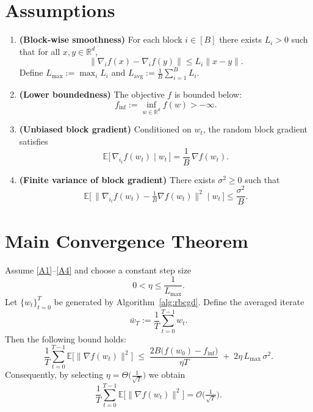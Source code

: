 \documentclass{article}
\begin{document}
\section*{Assumptions}
\begin{enumerate}[label=\textbf{A\arabic*}]
\item \label{A1} \textbf{(Block‑wise smoothness)}  
For each block $i\in[B]$ there exists $L_i>0$ such that for all $x,y\in\mathbb{R}^d$,
\[
\big\|\nabla_i f(x)-\nabla_i f(y)\big\|
   \le L_i\big\|x-y\big\|.
\]
Define $L_{\max}:=\max_i L_i$ and $L_{\mathrm{avg}}:=\frac1B\sum_{i=1}^B L_i$.

\item \label{A2} \textbf{(Lower boundedness)}  
The objective $f$ is bounded below:
\[
f_{\inf}:=\inf_{w\in\mathbb{R}^d} f(w) > -\infty .
\]

\item \label{A3} \textbf{(Unbiased block gradient)}  
Conditioned on $w_t$, the random block gradient satisfies
\[
\mathbb{E}\!\big[\,\nabla_{i_t} f(w_t)\mid w_t\,\big]=\frac1B\,\nabla f(w_t).
\]

\item \label{A4} \textbf{(Finite variance of block gradient)}  
There exists $\sigma^2\ge0$ such that
\[
\mathbb{E}\!\big[\,\|\nabla_{i_t} f(w_t)-\tfrac1B\nabla f(w_t)\|^2\mid w_t\,\big]
\le \frac{\sigma^2}{B}.
\]
\end{enumerate}

\section*{Main Convergence Theorem}
\begin{theorem}\label{thm:main}
Assume \ref{A1}–\ref{A4} and choose a constant step size
\[
0<\eta\le \frac{1}{L_{\max}} .
\]
Let $\{w_t\}_{t=0}^T$ be generated by Algorithm~\ref{alg:rbcgd}.  
Define the averaged iterate
\[
\bar w_T:=\frac1T\sum_{t=0}^{T-1} w_t .
\]
Then the following bound holds:
\[
\frac{1}{T}\sum_{t=0}^{T-1}\mathbb{E}\!\big[\|\nabla f(w_t)\|^2\big]
\;\le\;
\frac{2B\big(f(w_0)-f_{\inf}\big)}{\eta T}
\;+\;
2\eta\,L_{\max}\,\sigma^2 .
\tag{1}
\]
Consequently, by selecting $\eta = \Theta\!\big(\frac{1}{\sqrt{T}}\big)$ we obtain
\[
\frac{1}{T}\sum_{t=0}^{T-1}\mathbb{E}\!\big[\|\nabla f(w_t)\|^2\big]
= \mathcal{O}\!\big(\tfrac{1}{\sqrt{T}}\big).
\]
\end{theorem}
\end{document}
